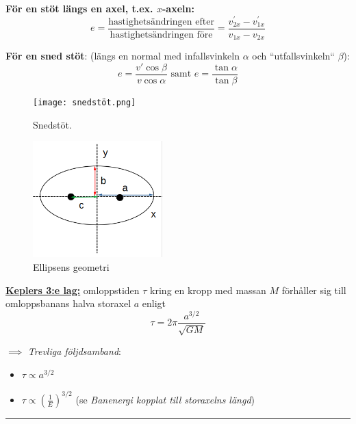 \documentclass{article}
\newenvironment{ankiflashcard}[1]{}{}
\newcommand{\ruler}{
\rule{0.5\textwidth}{0.5pt}
}
\begin{document}
\begin{paracol}{2}
\begin{ankiflashcard}{Ange de olika formlerna för studstal, inklusive snedstöt.}
    
\textbf{För en stöt längs en axel, t.ex. $x$-axeln:}
$$
e=\frac{\text{hastighetsändringen efter}}{\text{hastighetsändringen före}}=\frac{v_{2x}^{\prime}-{v_{1x}^{\prime}}}{v_{1x}-v_{2x}}
$$


\textbf{För en sned stöt}:
(längs en normal med infallsvinkeln $\alpha$ och ``utfallsvinkeln`` $\beta$):
$$
e=\frac{v'\cos\beta}{v\cos\alpha}\text{ samt } e =\frac{\tan \alpha}{\tan \beta}
$$
\begin{figure}[H]
    \centering
\texttt{[image: snedstöt.png]}
    \caption{Snedstöt.}
\end{figure}
\end{ankiflashcard}

\begin{ankiflashcard}{Rita upp de olika sträckorna i en ellips.}
    
\begin{figure}[H]
    \centering
    \includegraphics[width=5cm]{ellipsens_geometri.png}
    \caption{Ellipsens geometri}
\end{figure}
\end{ankiflashcard}

\begin{ankiflashcard}{Formulera Keplers 3:e lag}
\underline{\textbf{Keplers 3:e lag:}} omloppstiden $\tau$ kring en kropp med massan $M$ förhåller sig till omloppsbanans halva storaxel $a$ enligt
$$
\tau = 2\pi \frac{a^{3/2}}{\sqrt{GM}}
$$
\end{ankiflashcard}

\begin{ankiflashcard}{Formulera några trevliga följdsamband för Keplers tredje lag}
$\implies$ \textit{Trevliga följdsamband}:
\begin{itemize}
    \item $\tau \propto a^{3/2}$
    \item $\tau \propto (\frac{1}{E})^{3/2}$ (se \textit{Banenergi kopplat till storaxelns längd})
\end{itemize}
\end{ankiflashcard}
\ruler

\end{paracol}
\end{document}
